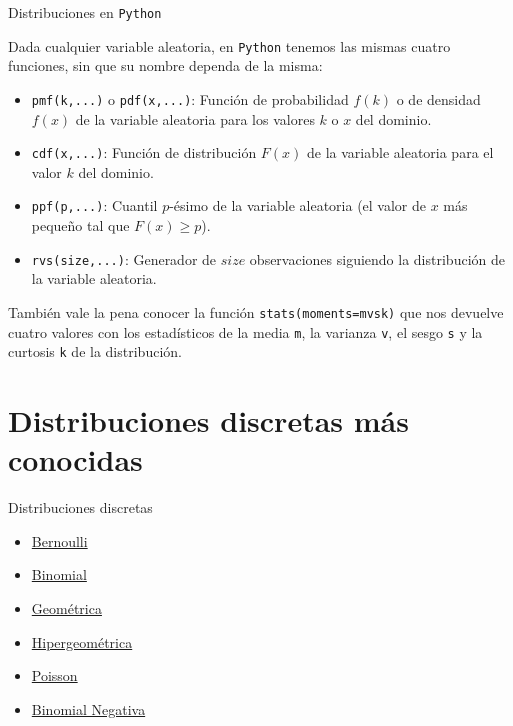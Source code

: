 \documentclass[
  ignorenonframetext,
]{beamer}
\providecommand{\tightlist}{%
  \setlength{\itemsep}{0pt}\setlength{\parskip}{0pt}}
\begin{document}
\begin{frame}[fragile]{Distribuciones en \texttt{Python}}
\protect\hypertarget{distribuciones-en-python}{}

Dada cualquier variable aleatoria, en \texttt{Python} tenemos las mismas
cuatro funciones, sin que su nombre dependa de la misma:

\begin{itemize}
\tightlist
\item
  \texttt{pmf(k,...)} o \texttt{pdf(x,...)}: Función de probabilidad
  \(f(k)\) o de densidad \(f(x)\) de la variable aleatoria para los
  valores \(k\) o \(x\) del dominio.
\item
  \texttt{cdf(x,...)}: Función de distribución \(F(x)\) de la variable
  aleatoria para el valor \(k\) del dominio.
\item
  \texttt{ppf(p,...)}: Cuantil \(p\)-ésimo de la variable aleatoria (el
  valor de \(x\) más pequeño tal que \(F(x)\geq p\)).
\item
  \texttt{rvs(size,...)}: Generador de \(size\) observaciones siguiendo
  la distribución de la variable aleatoria.
\end{itemize}

También vale la pena conocer la función
\texttt{stats(moments=\textquotesingle{}mvsk\textquotesingle{})} que nos
devuelve cuatro valores con los estadísticos de la media \texttt{m}, la
varianza \texttt{v}, el sesgo \texttt{s} y la curtosis \texttt{k} de la
distribución.

\end{frame}

\hypertarget{distribuciones-discretas-muxe1s-conocidas}{%
\section{Distribuciones discretas más
conocidas}\label{distribuciones-discretas-muxe1s-conocidas}}

\begin{frame}{Distribuciones discretas}
\protect\hypertarget{distribuciones-discretas}{}

\begin{itemize}
\tightlist
\item
  \href{https://es.wikipedia.org/wiki/Distribución_de_Bernoulli}{Bernoulli}
\item
  \href{https://es.wikipedia.org/wiki/Distribución_binomial}{Binomial}
\item
  \href{https://es.wikipedia.org/wiki/Distribución_geométrica}{Geométrica}
\item
  \href{https://es.wikipedia.org/wiki/Distribución_hipergeométrica}{Hipergeométrica}
\item
  \href{https://es.wikipedia.org/wiki/Distribución_de_Poisson}{Poisson}
\item
  \href{https://es.wikipedia.org/wiki/Distribución_binomial_negativa}{Binomial
  Negativa}
\end{itemize}

\end{frame}
\end{document}
